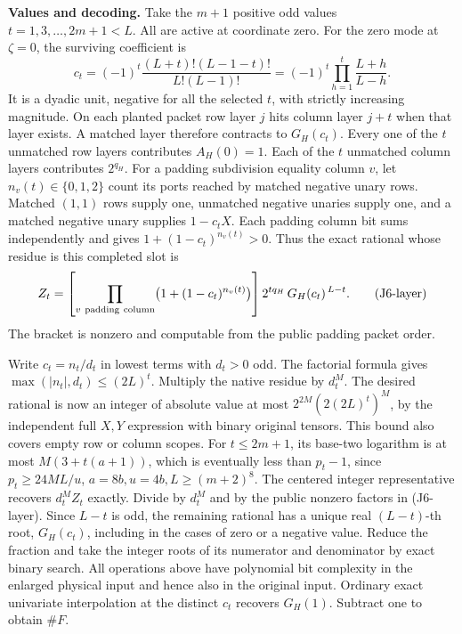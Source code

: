 \documentclass[
  11pt,
]{article}
\begin{document}
\textbf{Values and decoding.} Take the \(m+1\) positive odd values
\(t=1,3,\ldots,2m+1<L\). All are active at coordinate zero. For the zero
mode at \(\zeta=0\), the surviving coefficient is \[
       c_t=(-1)^t \frac{(L+t)!(L-1-t)!}{L!(L-1)!}
           =(-1)^t\prod_{h=1}^t\frac{L+h}{L-h}.
\] It is a dyadic unit, negative for all the selected \(t\), with
strictly increasing magnitude. On each planted packet row layer \(j\)
hits column layer \(j+t\) when that layer exists. A matched layer
therefore contracts to \(G_H(c_t)\). Every one of the \(t\) unmatched
row layers contributes \(A_H(0)=1\). Each of the \(t\) unmatched column
layers contributes \(2^{q_H}\). For a padding subdivision equality
column \(v\), let \(n_v(t)\in\{0,1,2\}\) count its ports reached by
matched negative unary rows. Matched \((1,1)\) rows supply one,
unmatched negative unaries supply one, and a matched negative unary
supplies \(1-c_tX\). Each padding column bit sums independently and
gives \(1+(1-c_t)^{n_v(t)}>0\). Thus the exact rational whose residue is
this completed slot is \[
 Z_t=\left[\prod_{v\ {\rm padding\ column}}\bigl(1+(1-c_t)^{n_v(t)}\bigr)\right]
                 2^{tq_H}\,G_H(c_t)^{\,L-t}.                     \tag{J6-layer}
\] The bracket is nonzero and computable from the public padding packet
order.

Write \(c_t=n_t/d_t\) in lowest terms with \(d_t>0\) odd. The factorial
formula gives \(\max(|n_t|,d_t)\le(2L)^t\). Multiply the native residue
by \(d_t^M\). The desired rational is now an integer of absolute value
at most \(2^{2M}(2(2L)^t)^M\), by the independent full \(X,Y\)
expression with binary original tensors. This bound also covers empty
row or column scopes. For \(t\le2m+1\), its base-two logarithm is at
most \(M(3+t(a+1))\), which is eventually less than \(p_t-1\), since
\(p_t\ge24ML/u\), \(a=8b,u=4b,L\ge(m+2)^8\). The centered integer
representative recovers \(d_t^M Z_t\) exactly. Divide by \(d_t^M\) and
by the public nonzero factors in (J6-layer). Since \(L-t\) is odd, the
remaining rational has a unique real \((L-t)\)-th root, \(G_H(c_t)\),
including in the cases of zero or a negative value. Reduce the fraction
and take the integer roots of its numerator and denominator by exact
binary search. All operations above have polynomial bit complexity in
the enlarged physical input and hence also in the original input.
Ordinary exact univariate interpolation at the distinct \(c_t\) recovers
\(G_H(1)\). Subtract one to obtain \(\#F\).
\end{document}
